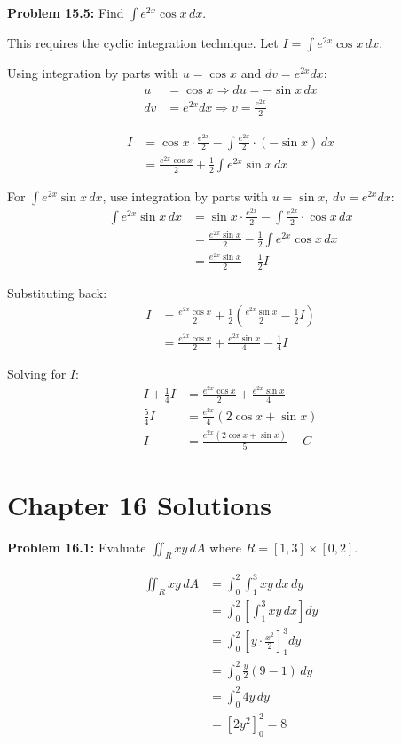 \documentclass[12pt,a4paper]{book}
\theoremstyle{definition}
\begin{document}
\begin{solution}
\textbf{Problem 15.5:} Find $\int e^{2x} \cos x \, dx$.

This requires the cyclic integration technique. Let $I = \int e^{2x} \cos x \, dx$.

Using integration by parts with $u = \cos x$ and $dv = e^{2x} dx$:
\begin{align}
u &= \cos x \Rightarrow du = -\sin x \, dx\\
dv &= e^{2x} dx \Rightarrow v = \frac{e^{2x}}{2}
\end{align}

\begin{align}
I &= \cos x \cdot \frac{e^{2x}}{2} - \int \frac{e^{2x}}{2} \cdot (-\sin x) \, dx\\
&= \frac{e^{2x}\cos x}{2} + \frac{1}{2}\int e^{2x} \sin x \, dx
\end{align}

For $\int e^{2x} \sin x \, dx$, use integration by parts with $u = \sin x$, $dv = e^{2x} dx$:
\begin{align}
\int e^{2x} \sin x \, dx &= \sin x \cdot \frac{e^{2x}}{2} - \int \frac{e^{2x}}{2} \cdot \cos x \, dx\\
&= \frac{e^{2x}\sin x}{2} - \frac{1}{2}\int e^{2x} \cos x \, dx\\
&= \frac{e^{2x}\sin x}{2} - \frac{1}{2}I
\end{align}

Substituting back:
\begin{align}
I &= \frac{e^{2x}\cos x}{2} + \frac{1}{2}\left(\frac{e^{2x}\sin x}{2} - \frac{1}{2}I\right)\\
&= \frac{e^{2x}\cos x}{2} + \frac{e^{2x}\sin x}{4} - \frac{1}{4}I
\end{align}

Solving for $I$:
\begin{align}
I + \frac{1}{4}I &= \frac{e^{2x}\cos x}{2} + \frac{e^{2x}\sin x}{4}\\
\frac{5}{4}I &= \frac{e^{2x}}{4}(2\cos x + \sin x)\\
I &= \frac{e^{2x}(2\cos x + \sin x)}{5} + C
\end{align}
\end{solution}

\section*{Chapter 16 Solutions}

\begin{solution}
\textbf{Problem 16.1:} Evaluate $\iint_R xy \, dA$ where $R = [1,3] \times [0,2]$.

\begin{align}
\iint_R xy \, dA &= \int_0^2 \int_1^3 xy \, dx \, dy\\
&= \int_0^2 \left[ \int_1^3 xy \, dx \right] dy\\
&= \int_0^2 \left[ y \cdot \frac{x^2}{2} \right]_1^3 dy\\
&= \int_0^2 \frac{y}{2}(9 - 1) \, dy\\
&= \int_0^2 4y \, dy\\
&= \left[ 2y^2 \right]_0^2 = 8
\end{align}
\end{solution}
\end{document}
